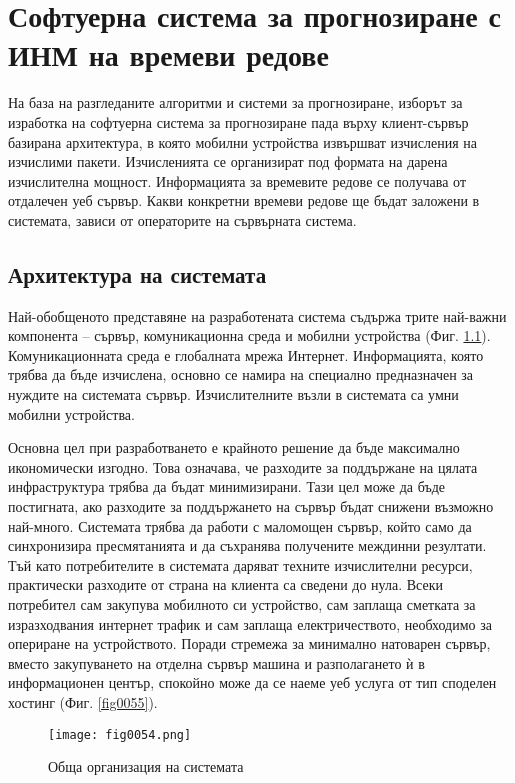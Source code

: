 \chapter{Софтуерна система за прогнозиране с ИНМ на времеви редове}

На база на разгледаните алгоритми и системи за прогнозиране, изборът за изработка на софтуерна система за прогнозиране пада върху клиент-сървър базирана архитектура, в която мобилни устройства извършват изчисления на изчислими пакети. Изчисленията се организират под формата на дарена изчислителна мощност. Информацията за времевите редове се получава от отдалечен уеб сървър. Какви конкретни времеви редове ще бъдат заложени в системата, зависи от операторите на сървърната система.

\section{Архитектура на системата}

Най-обобщеното представяне на разработената система съдържа трите най-важни компонента – сървър, комуникационна среда и мобилни устройства (Фиг. \ref{fig0054}). Комуникационната среда е глобалната мрежа Интернет. Информацията, която трябва да бъде изчислена, основно се намира на специално предназначен за нуждите на системата сървър. Изчислителните възли в системата са умни мобилни устройства. 

Основна цел при разработването е крайното решение да бъде максимално икономически изгодно. Това означава, че разходите за поддържане на цялата инфраструктура трябва да бъдат минимизирани. Тази цел може да бъде постигната, ако разходите за поддържането на сървър бъдат снижени възможно най-много. Системата трябва да работи с маломощен сървър, който само да синхронизира пресмятанията и да съхранява получените междинни резултати. Тъй като потребителите в системата даряват техните изчислителни ресурси, практически разходите от страна на клиента са сведени до нула. Всеки потребител сам закупува мобилното си устройство, сам заплаща сметката за изразходвания интернет трафик и сам заплаща електричеството, необходимо за опериране на устройството. Поради стремежа за минимално натоварен сървър, вместо закупуването на отделна сървър машина и разполагането ѝ в информационен център, спокойно може да се наеме уеб услуга от тип споделен хостинг (Фиг. \ref{fig0055}). 

\begin{figure}[H]
  \centering
  \texttt{[image: fig0054.png]}
  \caption{Обща организация на системата}
\label{fig0054}
\end{figure}

